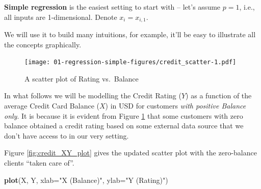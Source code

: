 \documentclass[10pt,b5paper,krantz1]{krantz}
\newenvironment{Shaded}{\begin{snugshade}}{\end{snugshade}}
\newcommand{\CommentTok}[1]{\textcolor[rgb]{0.37,0.37,0.37}{\textit{#1}}}
\newcommand{\DataTypeTok}[1]{\textcolor[rgb]{0.27,0.27,0.27}{#1}}
\newcommand{\DecValTok}[1]{\textcolor[rgb]{0.06,0.06,0.06}{#1}}
\newcommand{\KeywordTok}[1]{\textcolor[rgb]{0.27,0.27,0.27}{\textbf{#1}}}
\newcommand{\NormalTok}[1]{#1}
\newcommand{\OperatorTok}[1]{\textcolor[rgb]{0.43,0.43,0.43}{\textbf{#1}}}
\newcommand{\StringTok}[1]{\textcolor[rgb]{0.5,0.5,0.5}{#1}}
\begin{document}
\textbf{Simple regression} is the easiest setting to start with -- let's assume
\(p=1\), i.e., all inputs are 1-dimensional.
Denote \(x_i=x_{i,1}\).

We will use it to build many intuitions, for example, it'll be easy
to illustrate all the concepts graphically.

\begin{Shaded}
\end{Shaded}

\begin{figure}
\hypertarget{fig:credit_scatter}{%
\centering
\texttt{[image: 01-regression-simple-figures/credit\_scatter-1.pdf]}
\caption{A scatter plot of Rating vs.~Balance}\label{fig:credit_scatter}
}
\end{figure}

In what follows we will be modelling the Credit Rating (\(Y\))
as a function of the average Credit Card Balance (\(X\)) in USD
for customers \emph{with positive Balance only}.
It is because it is evident from Figure \ref{fig:credit_scatter}
that some customers with zero balance obtained a credit rating
based on some external data source that we don't have access to in
our very setting.

\begin{Shaded}
\end{Shaded}

Figure \ref{fig:credit_XY_plot} gives the updated scatter plot
with the zero-balance clients ``taken care of''.

\begin{Shaded}
\begin{Highlighting}[]
\KeywordTok{plot}\NormalTok{(X, Y, }\DataTypeTok{xlab=}\StringTok{"X (Balance)"}\NormalTok{, }\DataTypeTok{ylab=}\StringTok{"Y (Rating)"}\NormalTok{)}
\end{Highlighting}
\end{Shaded}
\end{document}
